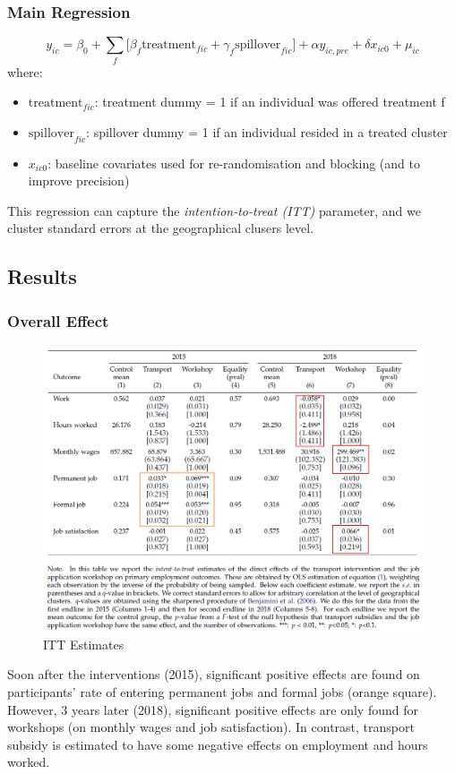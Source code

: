         \subsubsection{Main Regression}
            \begin{equation*}
                y_{ic} = \beta_0 + \sum_{f} \big[ \beta_f \text{treatment}_{fic} + \gamma_f \text{spillover}_{fic} \big] + \alpha y_{ic, pre} + \delta x_{ic0} + \mu_{ic}
            \end{equation*}
            where:
            \begin{itemize}
                \item $\text{treatment}_{fic}$: treatment dummy = 1 if an individual was offered treatment f
                \item $\text{spillover}_{fic}$: spillover dummy = 1 if an individual resided in a treated cluster
                \item $x_{ic0}$: baseline covariates used for re-randomisation and blocking (and to improve precision)
            \end{itemize}
            This regression can capture the \emph{intention-to-treat (ITT)} parameter, and we cluster standard errors at the geographical clusers level.
            
    \subsection{Results}
    
        \subsubsection{Overall Effect}
            \begin{figure}[H]
                \centering
                \includegraphics[width=5in]{images/ch6/Abebe result 1.png}
                \caption{ITT Estimates}
            \end{figure}
            Soon after the interventions (2015), significant positive effects are found on participants' rate of entering permanent jobs and formal jobs (orange square). However, 3 years later (2018), significant positive effects are only found for workshops (on monthly wages and job satisfaction). In contrast, transport subsidy is estimated to have some negative effects on employment and hours worked.
            
